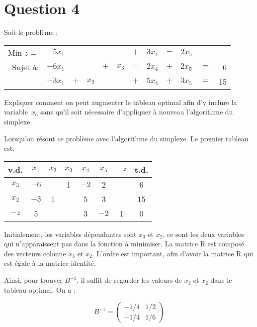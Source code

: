 \section*{Question 4}
\begin{em}
Soit le problème :

\begin{tabular}{@{}rrrrrrrrrrrr@{}}
	Min $z =$ &  $5x_1$ &     &       &     &       & $+$ & $3x_4$ & $-$ & $2x_5$ &     &    \\
	 Sujet à: & $-6x_1$ &     &       & $+$ & $x_3$ & $-$ & $2x_4$ & $+$ & $2x_5$ & $=$ &  6 \\
	          & $-3x_1$ & $+$ & $x_2$ &     &       & $+$ & $5x_4$ & $+$ & $3x_5$ & $=$ & 15
\end{tabular}

Expliquer comment on peut augmenter le tableau optimal afin d’y inclure la variable~$x_6$ sans qu’il soit nécessaire d’appliquer à nouveau l’algorithme du simplexe.
\end{em}

Lorsqu’on résout ce problème avec l’algorithme du simplexe. Le premier tableau est:

\begin{center}
	\renewcommand{\arraystretch}{1.5}
	\begin{tabular}{|c|cccccc|c|}
		\hline
		 v.d.   & $x_{1}$ & $x_{2}$ & $x_{3}$ & $x_{4}$ & $x_{5}$ & $-z$ & t.d. \\ \hline
		$x_{3}$ &  $-6$   &         &    1    &  $-2$   &    2    &      &  6   \\
		$x_{2}$ &  $-3$   &    1    &         &    5    &    3    &      &  15  \\ \hline
		 $-z$   &    5    &         &         &    3    &  $-2$   &  1   &  0   \\ \hline
	\end{tabular}
\end{center}

Initialement, les variables dépendantes sont $x_3$ et $x_2$, ce sont les deux variables qui n’apparaissent pas dans la fonction à minimiser. La matrice R est composé des vecteurs colonne $x_3$ et $x_2$. L’ordre est important, afin d’avoir la matrice R qui est égale à la matrice identité.

Ainsi, pour trouver $B^{-1}$, il suffit de regarder les valeurs de $x_3$ et $x_2$ dans le tableau optimal. On a :

\[
B^{-1} = 
\begin{pmatrix}
	-1/4 & 1/2 \\
	-1/4 & 1/6
\end{pmatrix}
\]

